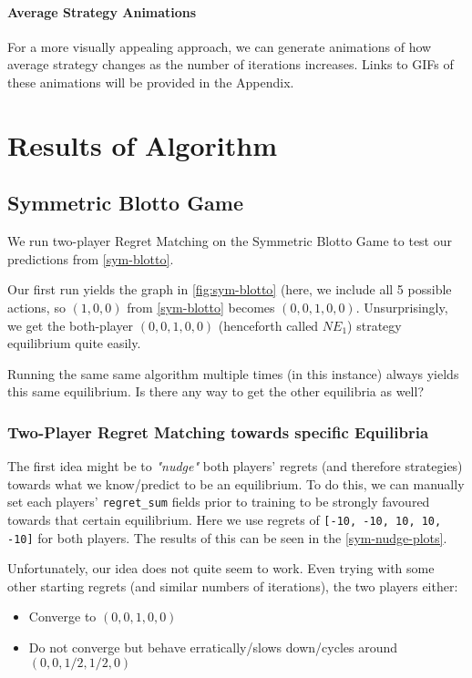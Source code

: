 \documentclass [11pt]{article}
\begin{document}
\paragraph{Average Strategy Animations}

For a more visually appealing approach, we can generate animations of how average strategy changes as the number of iterations increases. Links to GIFs of these animations will be provided in the Appendix.

\section{Results of Algorithm} \label{results}

\subsection{Symmetric Blotto Game}

We run two-player Regret Matching on the Symmetric Blotto Game to test our predictions from \ref{sym-blotto}.

Our first run yields the graph in \ref{fig:sym-blotto} (here, we include all 5 possible actions, so $(1, 0, 0)$ from \ref{sym-blotto} becomes $(0, 0, 1, 0, 0)$. Unsurprisingly, we get the both-player $(0, 0, 1, 0, 0)$ (henceforth called $NE_1$) strategy equilibrium quite easily.

Running the same same algorithm multiple times (in this instance) always yields this same equilibrium. Is there any way to get the other equilibria as well?

\subsubsection{Two-Player Regret Matching towards specific Equilibria}

The first idea might be to \textit{"nudge"} both players' regrets (and therefore strategies) towards what we know/predict to be an equilibrium. To do this, we can manually set each players' \texttt{regret\_sum} fields prior to training to be strongly favoured towards that certain equilibrium. Here we use regrets of \texttt{[-10, -10, 10, 10, -10]} for both players. The results of this can be seen in the \ref{sym-nudge-plots}.

Unfortunately, our idea does not quite seem to work. Even trying with some other starting regrets (and similar numbers of iterations), the two players either:

\begin{itemize}
  \item Converge to $(0, 0, 1, 0, 0)$
  \item Do not converge but behave erratically/slows down/cycles around $(0, 0, 1/2, 1/2, 0)$
\end{itemize}
\end{document}
